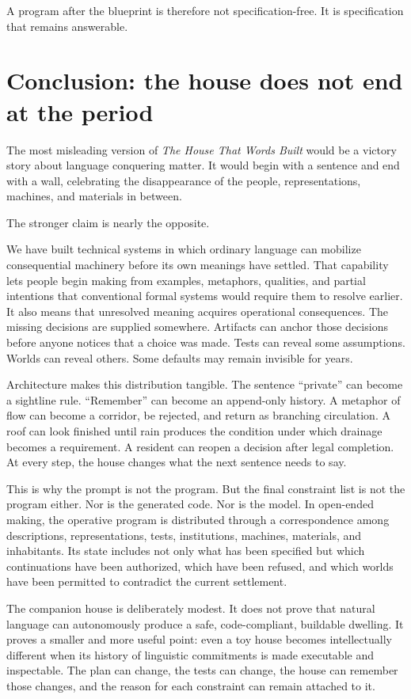 \documentclass[11pt]{article}
\begin{document}
A program after the blueprint is therefore not specification-free. It is specification that remains answerable.

\section{Conclusion: the house does not end at the period}

The most misleading version of \emph{The House That Words Built} would be a victory story about language conquering matter. It would begin with a sentence and end with a wall, celebrating the disappearance of the people, representations, machines, and materials in between.

The stronger claim is nearly the opposite.

We have built technical systems in which ordinary language can mobilize consequential machinery before its own meanings have settled. That capability lets people begin making from examples, metaphors, qualities, and partial intentions that conventional formal systems would require them to resolve earlier. It also means that unresolved meaning acquires operational consequences. The missing decisions are supplied somewhere. Artifacts can anchor those decisions before anyone notices that a choice was made. Tests can reveal some assumptions. Worlds can reveal others. Some defaults may remain invisible for years.

Architecture makes this distribution tangible. The sentence ``private'' can become a sightline rule. ``Remember'' can become an append-only history. A metaphor of flow can become a corridor, be rejected, and return as branching circulation. A roof can look finished until rain produces the condition under which drainage becomes a requirement. A resident can reopen a decision after legal completion. At every step, the house changes what the next sentence needs to say.

This is why the prompt is not the program. But the final constraint list is not the program either. Nor is the generated code. Nor is the model. In open-ended making, the operative program is distributed through a correspondence among descriptions, representations, tests, institutions, machines, materials, and inhabitants. Its state includes not only what has been specified but which continuations have been authorized, which have been refused, and which worlds have been permitted to contradict the current settlement.

The companion house is deliberately modest. It does not prove that natural language can autonomously produce a safe, code-compliant, buildable dwelling. It proves a smaller and more useful point: even a toy house becomes intellectually different when its history of linguistic commitments is made executable and inspectable. The plan can change, the tests can change, the house can remember those changes, and the reason for each constraint can remain attached to it.
\end{document}

